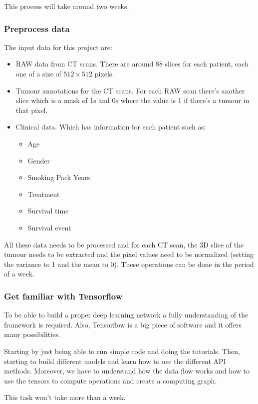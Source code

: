 This process will take around two weeks.

\subsubsection{Preprocess data}

The input data for this project are:
\begin{itemize}
  \item RAW data from CT scans. There are around 88 slices for each patient, each one of 
  a size of \( 512 \times 512 \) pixels.
  \item Tumour annotations for the CT scans. For each RAW scan there's another slice which
  is a mask of 1s and 0s where the value is 1 if there's a tumour in that pixel.
  \item Clinical data. Which has information for each patient such as:
  \begin{itemize}
    \item Age
    \item Gender
    \item Smoking Pack Years
    \item Treatment
    \item Survival time
    \item Survival event
  \end{itemize}
\end{itemize}

All these data needs to be processed and for each CT scan, the 3D slice of the tumour needs to
be extracted and the pixel values need to be normalized (setting the variance to 1 and the 
mean to 0). These operations can be done in the period of a week.

\subsubsection{Get familiar with Tensorflow}

To be able to build a proper deep learning network a fully understanding of the framework 
is required. Also, Tensorflow is a big piece of software and it offers many possibilities.

Starting by just being able to run simple code and doing the tutorials. Then,
starting to build different models and learn how to use the different API methods.
Moreover, we have to understand how the data flow works and how to use the tensors to 
compute operations and create a computing graph.

This task won't take more than a week.

